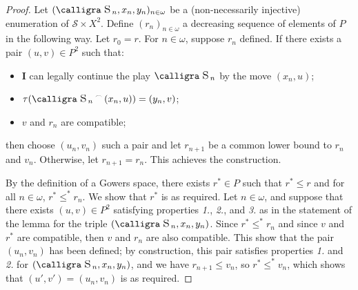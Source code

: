 \documentclass[a4paper,11pt]{article}
\theoremstyle{definition}
\numberwithin{equation}{section}
\newcommand{\St}{\mathcal{S}}
\newcommand{\I}{\textbf{I}}
\newcommand{\st}{\text{{\calligra \LARGE s}}\,}
\newcommand{\concat}{%
  \mathbin{\raisebox{1ex}{\scalebox{.7}{$\frown$}}}%
}
\begin{document}
\begin{proof}

Let $(\st_n, x_n, y_n)_{n \in \omega}$ be a (non-necessarily injective) enumeration of $\St \times X^2$. Define $(r_n)_{n \in \omega}$ a decreasing sequence of elements of $P$ in the following way. Let $r_0 = r$. For $n \in \omega$, suppose $r_n$ defined. If there exists a pair $(u, v) \in P^2$ such that:

\begin{itemize}

\item \I{} can legally continue the play $\st_n$ by the move $(x_n, u)$;

\item $\tau(\st_n \concat (x_n, u)) = (y_n, v)$;

\item $v$ and $r_n$ are compatible;

\end{itemize}

\noindent then choose $(u_n, v_n)$ such a pair and let $r_{n + 1}$ be a common lower bound to $r_n$ and $v_n$. Otherwise, let $r_{n + 1} = r_n$. This achieves the construction.

\smallskip

By the definition of a Gowers space, there exists $r^* \in P$ such that $r^* \leqslant r$ and for all $n \in \omega$, $r^* \leqslant^* r_n$. We show that $r^*$ is as required. Let $n \in \omega$, and suppose that there exists $(u, v) \in P^2$ satisfying properties \emph{1.}, \emph{2.}, and \emph{3.} as in the statement of the lemma for the triple $(\st_n, x_n, y_n)$. Since $r^* \leqslant^* r_n$ and since $v$ and $r^*$ are compatible, then $v$ and $r_n$ are also compatible. This show that the pair $(u_n, v_n)$ has been defined; by construction, this pair satisfies properties \emph{1.} and \emph{2.} for $(\st_n, x_n, y_n)$, and we have $r_{n + 1} \leqslant v_n$, so $r^* \leqslant ^* v_n$, which shows that $(u', v') = (u_n, v_n)$ is as required.

\end{proof}
\end{document}
